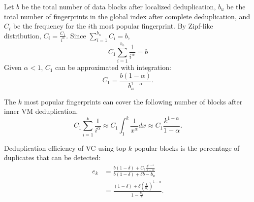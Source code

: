 Let $b$ be the total number of data blocks after localized deduplication, 
$b_u$ be the total number of fingerprints 
in the global index after complete deduplication, and
$C_i$ be the frequency for the $i$th most popular fingerprint. 
By Zipf-like distribution, $C_i = \frac{C_1}{i^\alpha}.$
Since $ \sum_{i=1}^{b_u}C_i = b$,
\[
C_1 \sum_{i=1}^{b_u}\frac{1}{i^\alpha} = b
\]
Given $\alpha <1$, $C_1$ can be approximated with integration:
\begin{equation}
C_1=\frac{b(1-\alpha)}{b_u^{1-\alpha}}.
\end{equation}


The  $k$ most popular fingerprints can cover the following number of blocks after inner VM 
deduplication.
\[
C_1 \sum_{i=1}^{k}\frac{1}{i^\alpha} \approx  
C_1 \int_{1}^{k}\frac{1}{x^\alpha} dx  \approx  C_1\frac{  k^{1-\alpha}} {1-\alpha}.
\]

Deduplication efficiency of VC using top $k$ popular blocks
is the percentage of duplicates that can be detected:  
\begin{equation}
\begin{split}
e_k &= 
\frac{ b(1-\delta) + C_1\frac{  k^{1-\alpha}} {1-\alpha}} 
{b(1-\delta)  + \delta b - b_u }\\
&= 
\frac{ (1-\delta) + \delta  (\frac{k}{b_u})^{1-\alpha}}
{ 1- \frac{b_u}{b} }.
\end{split}
\end{equation}




